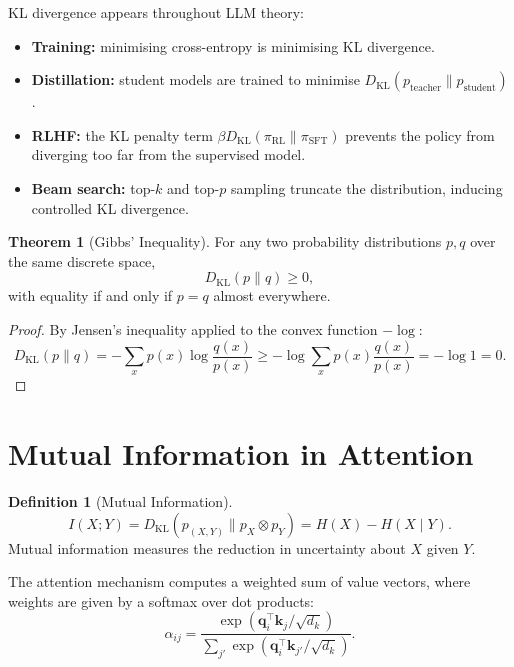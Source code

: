\documentclass[11pt,a4paper]{book}
\theoremstyle{definition}
\newtheorem{definition}{Definition}[chapter]
\newtheorem{theorem}{Theorem}[chapter]
\begin{document}
KL divergence appears throughout LLM theory:
\begin{itemize}
	\item \textbf{Training:} minimising cross-entropy is minimising KL divergence.
	\item \textbf{Distillation:} student models are trained to minimise $D_{\mathrm{KL}}(p_\text{teacher} \parallel p_\text{student})$.
	\item \textbf{RLHF:} the KL penalty term $\beta D_{\mathrm{KL}}(\pi_{\mathrm{RL}} \parallel \pi_{\mathrm{SFT}})$ prevents the policy from diverging too far from the supervised model.
	\item \textbf{Beam search:} top-$k$ and top-$p$ sampling truncate the distribution, inducing controlled KL divergence.
\end{itemize}

\begin{theorem}[Gibbs' Inequality]
	For any two probability distributions $p, q$ over the same discrete space,
	\begin{equation}
		D_{\mathrm{KL}}(p \parallel q) \geq 0,
	\end{equation}
	with equality if and only if $p = q$ almost everywhere.
\end{theorem}

\begin{proof}
	By Jensen's inequality applied to the convex function $-\log$:
	\begin{equation}
		D_{\mathrm{KL}}(p \parallel q) = -\sum_x p(x) \log \frac{q(x)}{p(x)} \geq -\log \sum_x p(x) \frac{q(x)}{p(x)} = -\log 1 = 0.
	\end{equation}
\end{proof}

\section{Mutual Information in Attention}

\begin{definition}[Mutual Information]
	\begin{equation}
		I(X;Y) = D_{\mathrm{KL}}(p_{(X,Y)} \parallel p_X \otimes p_Y) = H(X) - H(X \mid Y).
	\end{equation}
	Mutual information measures the reduction in uncertainty about $X$ given $Y$.
\end{definition}

The attention mechanism computes a weighted sum of value vectors, where weights are given by a softmax over dot products:
\begin{equation}
	\alpha_{ij} = \frac{\exp(\mathbf{q}_i^\top \mathbf{k}_j / \sqrt{d_k})}{\sum_{j'} \exp(\mathbf{q}_i^\top \mathbf{k}_{j'} / \sqrt{d_k})}.
\end{equation}
\end{document}
